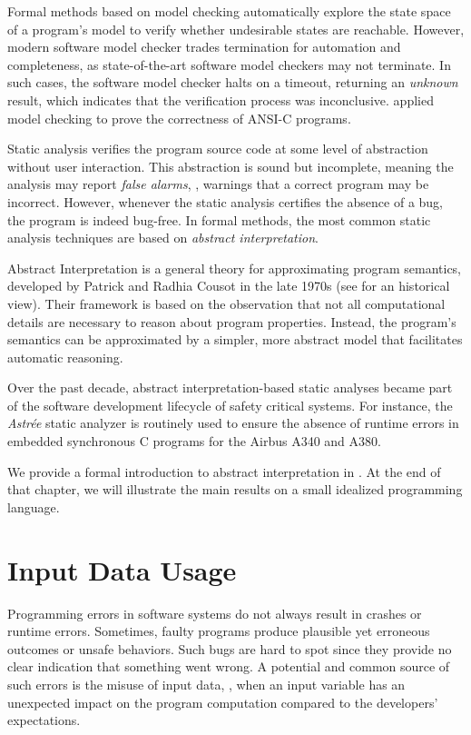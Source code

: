 Formal methods based on model checking  automatically explore the state space of a program's model to verify whether undesirable states are reachable.
However, modern software model checker trades termination for automation and completeness, as state-of-the-art software model checkers may not terminate.
In such cases, the software model checker halts on a timeout, returning an \emph{unknown} result, which indicates that the verification process was inconclusive.
 applied model checking to prove the correctness of ANSI-C programs.

Static analysis verifies the program source code at some level of abstraction without user interaction.
This abstraction is sound but incomplete, meaning the analysis may report \emph{false alarms}, \ie, warnings that a correct program may be incorrect.
However, whenever the static analysis certifies the absence of a bug, the program is indeed bug-free.
In formal methods, the most common static analysis techniques are based on \emph{abstract interpretation}.

Abstract Interpretation  is a general theory for approximating program semantics, developed by Patrick and Radhia Cousot in the late 1970s (see  for an historical view).
Their framework is based on the observation that not all computational details are necessary to reason about program properties.
Instead, the program's semantics can be approximated by a simpler, more abstract model that facilitates automatic reasoning.

Over the past decade, abstract interpretation-based static analyses became part of the software development lifecycle of safety critical systems.
For instance, the \emph{Astrée} static analyzer  is routinely used to ensure the absence of runtime errors in embedded synchronous C programs for the Airbus A340 and A380.

We provide a formal introduction to abstract interpretation in .
At the end of that chapter, we will illustrate the main results on a small idealized programming language.

\section{Input Data Usage}

Programming errors in software systems do not always result in crashes or runtime errors.
Sometimes, faulty programs produce plausible yet erroneous outcomes or unsafe behaviors.
Such bugs are hard to spot since they provide no clear indication that something went wrong.
A potential and common source of such errors is the misuse of input data, \ie, when an input variable has an unexpected impact on the program computation compared to the developers' expectations.

